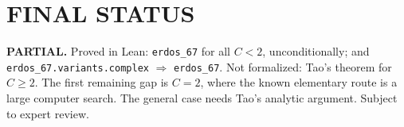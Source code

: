 \section{FINAL STATUS}
\textbf{PARTIAL.} Proved in Lean: \texttt{erdos\_67} for all $C<2$, unconditionally; and \texttt{erdos\_67.variants.complex} $\Rightarrow$ \texttt{erdos\_67}. Not formalized: Tao's theorem for $C\ge2$. The first remaining gap is $C=2$, where the known elementary route is a large computer search. The general case needs Tao's analytic argument. Subject to expert review.
